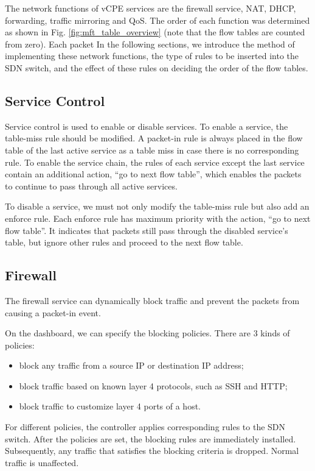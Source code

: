 \documentclass[conference]{IEEEtran}
\begin{document}
The network functions of vCPE services are the firewall service, NAT, DHCP, forwarding, traffic mirroring and QoS. The order of each function was determined as shown in Fig. \ref{fig:mft_table_overview} (note that the flow tables are counted from zero). Each packet In the following sections, we introduce the method of implementing these network functions, the type of rules to be inserted into the SDN switch, and the effect of these rules on deciding the order of the flow tables.

\subsection{Service Control}
Service control is used to enable or disable services. To enable a service, the table-miss rule should be modified. A packet-in rule is always placed in the flow table of the last active service as a table miss in case there is no corresponding rule. To enable the service chain, the rules of each service except the last service contain an additional action, ``go to next flow table'', which enables the packets to continue to pass through all active services.

To disable a service, we must not only modify the table-miss rule but also add an enforce rule. Each enforce rule has maximum priority with the action, ``go to next flow table''. It indicates that packets still pass through the disabled service’s table, but ignore other rules and proceed to the next flow table.

\subsection{Firewall}
The firewall service can dynamically block traffic and prevent the packets from causing a packet-in event.

On the dashboard, we can specify the blocking policies. There are 3 kinds of policies:
\begin{itemize}[]
\item block any traffic from a source IP or destination IP address;
\item block traffic based on known layer 4 protocols, such as SSH and HTTP;
\item block traffic to customize layer 4 ports of a host.
\end{itemize}

For different policies, the controller applies corresponding rules to the SDN switch. After the policies are set, the blocking rules are immediately installed. Subsequently, any traffic that satisfies the blocking criteria is dropped. Normal traffic is unaffected.
\end{document}

